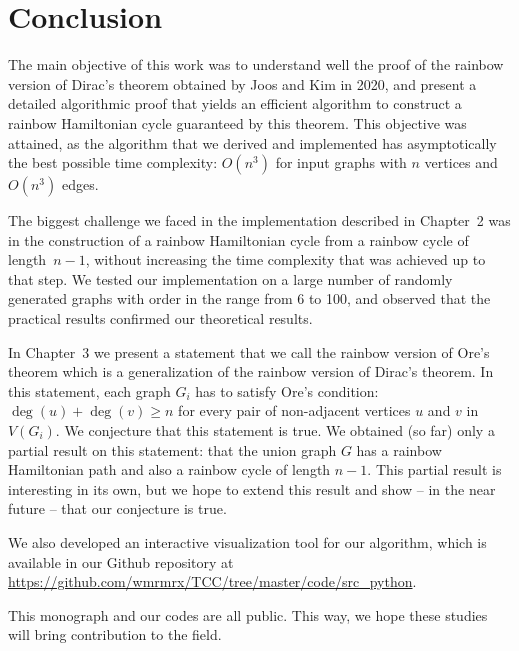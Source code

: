 
\chapter{Conclusion}   %

The main objective of this work was to understand well the proof of
the rainbow version of Dirac's theorem obtained by Joos and Kim in
2020, and present a detailed algorithmic proof that yields an
efficient algorithm to construct a rainbow Hamiltonian cycle
guaranteed by this theorem.  This objective was attained, as the
algorithm that we derived and implemented has asymptotically the best
possible time complexity: $O(n^3)$ for input graphs with $n$ vertices
and $O(n^3)$ edges.

The biggest challenge we faced in the implementation described in
Chapter~2 was in the construction of a rainbow Hamiltonian cycle from
a rainbow cycle of length~$n-1$, without increasing the time
complexity that was achieved up to that step.  We tested our
implementation on a large number of randomly generated graphs with
order in the range from 6 to 100, and observed that the practical
results confirmed our theoretical results.

In Chapter~3 we present a statement that we call the rainbow version
of Ore's theorem which is a generalization of the rainbow version of
Dirac's theorem. In this statement, each graph $G_i$ has to satisfy
Ore's condition: $\deg(u) + \deg(v) \geq n$ for every pair of
non-adjacent vertices $u$ and $v$ in $V(G_i)$.  We conjecture that
this statement is true. We obtained (so far) only a partial result on
this statement: that the union graph $G$ has a rainbow Hamiltonian
path and also a rainbow cycle of length $n-1$. This partial result is
interesting in its own, but we hope to extend this result and 
show -- in the near future -- that our conjecture is true.

We also developed an interactive visualization tool for our algorithm,
which is available in our Github repository at
\url{https://github.com/wmrmrx/TCC/tree/master/code/src_python}.

This monograph and our codes are all public. This way, we hope these
studies will bring contribution to the field.



